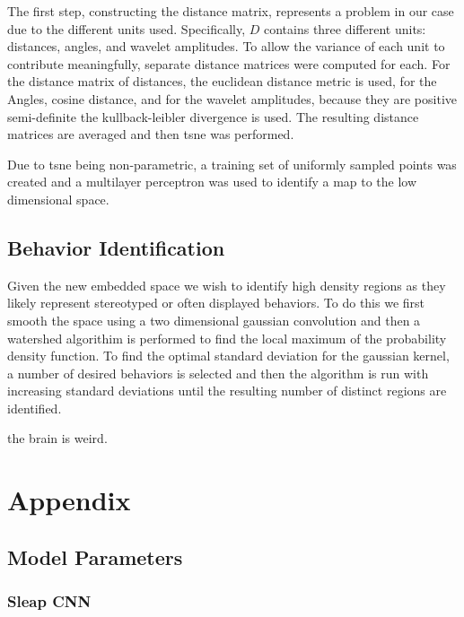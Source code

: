 \documentclass[12pt,english]{article}
\begin{document}
The first step, constructing the distance matrix, represents a problem in our case due to the different units used. Specifically, \( D \) contains three different units: distances, angles, and wavelet amplitudes. To allow the variance of each unit to contribute meaningfully, separate distance matrices were computed for each. For the distance matrix of distances, the euclidean distance metric is used, for the Angles, cosine distance, and for the wavelet amplitudes, because they are positive semi-definite the kullback-leibler divergence is used. The resulting distance matrices are averaged and then  tsne was performed. 

Due to tsne being non-parametric, a training set of uniformly sampled points was created and a multilayer perceptron was used to identify a map to the low dimensional space.  

\subsection{Behavior Identification}
Given the new embedded space we wish to identify high density regions as they likely represent stereotyped or often displayed behaviors. To do this we first smooth the space using a two dimensional gaussian convolution and then a watershed algorithim is performed to find the local maximum of the probability density function. To find the optimal standard deviation for the gaussian kernel, a number of desired behaviors is selected and then the algorithm is run with increasing standard deviations until the resulting number of distinct regions are identified.  


the brain is weird. %








\section{Appendix}

\subsection{Model Parameters}
\subsubsection{Sleap CNN}
\end{document}
